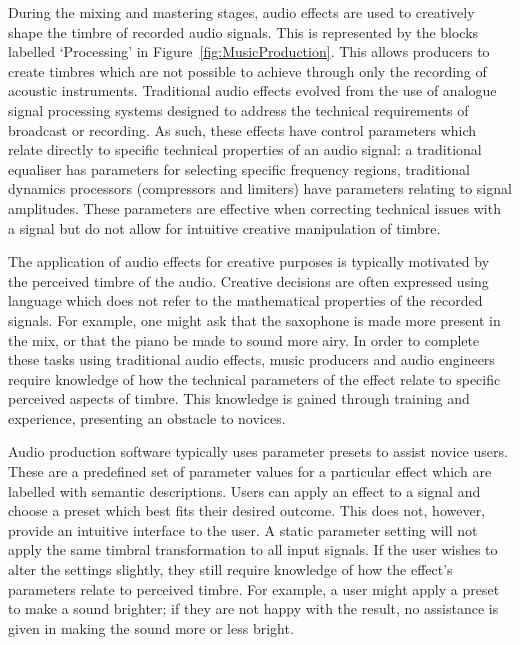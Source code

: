 	During the mixing and mastering stages, audio effects are used to creatively shape the timbre of recorded audio
	signals. This is represented by the blocks labelled `Processing' in Figure~\ref{fig:MusicProduction}. This allows
	producers to create timbres which are not possible to achieve through only the recording of acoustic instruments.
	Traditional audio effects evolved from the use of analogue signal processing systems designed to address the
	technical requirements of broadcast or recording. As such, these effects have control parameters which relate
	directly to specific technical properties of an audio signal: a traditional equaliser has parameters for selecting
	specific frequency regions, traditional dynamics processors (compressors and limiters) have parameters relating to
	signal amplitudes. These parameters are effective when correcting technical issues with a signal but do not allow
	for intuitive creative manipulation of timbre.

	The application of audio effects for creative purposes is typically motivated by the perceived timbre of the audio.
	Creative decisions are often expressed using language which does not refer to the mathematical properties of the
	recorded signals. For example, one might ask that the saxophone is made more present in the mix, or that the piano
	be made to sound more airy. In order to complete these tasks using traditional audio effects, music producers and
	audio engineers require knowledge of how the technical parameters of the effect relate to specific perceived aspects
	of timbre. This knowledge is gained through training and experience, presenting an obstacle to novices.

	Audio production software typically uses parameter presets to assist novice users. These are a predefined set of
	parameter values for a particular effect which are labelled with semantic descriptions. Users can apply an effect to
	a signal and choose a preset which best fits their desired outcome. This does not, however, provide an intuitive
	interface to the user. A static parameter setting will not apply the same timbral transformation to all input
	signals. If the user wishes to alter the settings slightly, they still require knowledge of how the effect's
	parameters relate to perceived timbre. For example, a user might apply a preset to make a sound brighter; if they
	are not happy with the result, no assistance is given in making the sound more or less bright.

